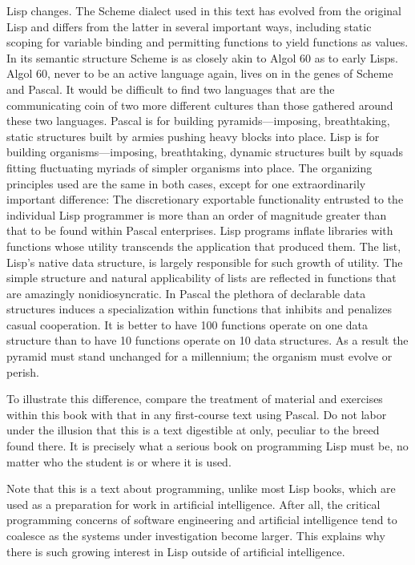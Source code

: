 Lisp changes.  The Scheme dialect used in this text has evolved from the
original Lisp and differs from the latter in several important ways, including
static scoping for variable binding and permitting functions to yield functions
as values.  In its semantic structure Scheme is as closely akin to Algol 60 as
to early Lisps.  Algol 60, never to be an active language again, lives on in
the genes of Scheme and Pascal.  It would be difficult to find two languages
that are the communicating coin of two more different cultures than those
gathered around these two languages.  Pascal is for building
pyramids---imposing, breathtaking, static structures built by armies pushing
heavy blocks into place.  Lisp is for building organisms---imposing,
breathtaking, dynamic structures built by squads fitting fluctuating myriads of
simpler organisms into place.  The organizing principles used are the same in
both cases, except for one extraordinarily important difference: The
discretionary exportable functionality entrusted to the individual Lisp
programmer is more than an order of magnitude greater than that to be found
within Pascal enterprises.  Lisp programs inflate libraries with functions
whose utility transcends the application that produced them.  The list, Lisp's
native data structure, is largely responsible for such growth of utility.  The
simple structure and natural applicability of lists are reflected in functions
that are amazingly nonidiosyncratic.  In Pascal the plethora of declarable data
structures induces a specialization within functions that inhibits and
penalizes casual cooperation.  It is better to have 100 functions operate on
one data structure than to have 10 functions operate on 10 data structures.  As
a result the pyramid must stand unchanged for a millennium; the organism must
evolve or perish.

To illustrate this difference, compare the treatment of material and exercises
within this book with that in any first-course text using Pascal.  Do not labor
under the illusion that this is a text digestible at  only,
peculiar to the breed found there.  It is precisely what a serious book on
programming Lisp must be, no matter who the student is or where it is used.

Note that this is a text about programming, unlike most Lisp books, which are
used as a preparation for work in artificial intelligence.  After all, the
critical programming concerns of software engineering and artificial
intelligence tend to coalesce as the systems under investigation become larger.
This explains why there is such growing interest in Lisp outside of artificial
intelligence.


